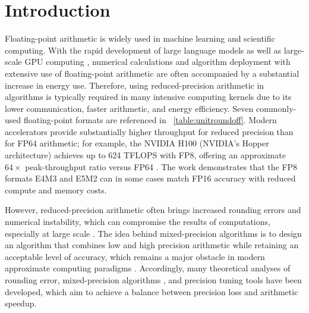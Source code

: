 \documentclass[Afour,sageh,times]{sagej}
\theoremstyle{plain}
\theoremstyle{definition}
\begin{document}

\maketitle


\section{Introduction}
\label{sec:introduction}


Floating-point arithmetic \citep{8766229} is widely used in machine learning and scientific computing. With the rapid development of large language models \citep{DBLP:journals/corr/abs-2005-14165, hu2022lora, touvron2023} as well as large-scale GPU computing \citep{DBLP:journals/corr/abs-1710-03740, peng2023fp8lmtrainingfp8large}, numerical calculations and algorithm deployment with extensive use of floating-point arithmetic are often accompanied by a substantial increase in energy use. Therefore, using reduced-precision arithmetic in algorithms is typically required in many intensive computing kernels due to its lower communication, faster arithmetic, and energy efficiency. Seven commonly-used floating-point formats are referenced in \tablename~\ref{table:unitroundoff}. Modern accelerators provide substantially higher throughput for reduced precision than for FP64 arithmetic; for example, the NVIDIA H100 (NVIDIA's Hopper architecture) achieves up to 624 TFLOPS with FP8, offering an approximate $64\times$ peak-throughput ratio versus FP64 \citep{nvidia_fp8}. The work \cite{nvidia_fp8} demonstrates that the FP8 formats E4M3 and E5M2 can in some cases match FP16 accuracy with reduced compute and memory costs.


However, reduced-precision arithmetic often brings increased rounding errors and numerical instability, which can compromise the results of computations, especially at large scale \citep{10.1177/1094342016652462}.  The idea behind mixed-precision algorithms is to design an algorithm that combines low and high precision arithmetic while retaining an acceptable level of accuracy, which remains a major obstacle in modern approximate computing paradigms \citep{benkhalifa:hal-03978176, 7348659}. Accordingly, many theoretical analyses of rounding error, mixed-precision algorithms \citep{doi:10.1137/17M1122918, doi:10.1137/17M1140819, doi:10.1137/20M1316822, doi:10.1137/17M1122918, abhl24}, and precision tuning tools \citep{6877460,  10.1145/3213846.3213862} have been developed, which aim to achieve a balance between precision loss and arithmetic speedup.
\end{document}
